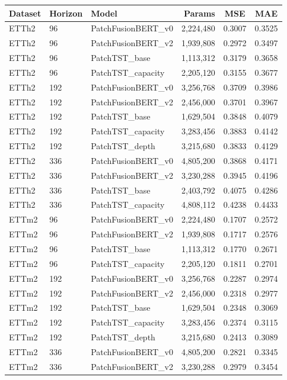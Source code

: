 \begin{tabular}{lllrcc}
\toprule
Dataset & Horizon & Model & Params & MSE & MAE \\
\midrule
ETTh2 & 96 & PatchFusionBERT_v0 & 2,224,480 & 0.3007 & 0.3525 \\
ETTh2 & 96 & PatchFusionBERT_v2 & 1,939,808 & 0.2972 & 0.3497 \\
ETTh2 & 96 & PatchTST_base & 1,113,312 & 0.3179 & 0.3658 \\
ETTh2 & 96 & PatchTST_capacity & 2,205,120 & 0.3155 & 0.3677 \\
ETTh2 & 192 & PatchFusionBERT_v0 & 3,256,768 & 0.3709 & 0.3986 \\
ETTh2 & 192 & PatchFusionBERT_v2 & 2,456,000 & 0.3701 & 0.3967 \\
ETTh2 & 192 & PatchTST_base & 1,629,504 & 0.3848 & 0.4079 \\
ETTh2 & 192 & PatchTST_capacity & 3,283,456 & 0.3883 & 0.4142 \\
ETTh2 & 192 & PatchTST_depth & 3,215,680 & 0.3833 & 0.4129 \\
ETTh2 & 336 & PatchFusionBERT_v0 & 4,805,200 & 0.3868 & 0.4171 \\
ETTh2 & 336 & PatchFusionBERT_v2 & 3,230,288 & 0.3945 & 0.4196 \\
ETTh2 & 336 & PatchTST_base & 2,403,792 & 0.4075 & 0.4286 \\
ETTh2 & 336 & PatchTST_capacity & 4,808,112 & 0.4238 & 0.4433 \\
ETTm2 & 96 & PatchFusionBERT_v0 & 2,224,480 & 0.1707 & 0.2572 \\
ETTm2 & 96 & PatchFusionBERT_v2 & 1,939,808 & 0.1717 & 0.2576 \\
ETTm2 & 96 & PatchTST_base & 1,113,312 & 0.1770 & 0.2671 \\
ETTm2 & 96 & PatchTST_capacity & 2,205,120 & 0.1811 & 0.2701 \\
ETTm2 & 192 & PatchFusionBERT_v0 & 3,256,768 & 0.2287 & 0.2974 \\
ETTm2 & 192 & PatchFusionBERT_v2 & 2,456,000 & 0.2318 & 0.2977 \\
ETTm2 & 192 & PatchTST_base & 1,629,504 & 0.2348 & 0.3069 \\
ETTm2 & 192 & PatchTST_capacity & 3,283,456 & 0.2374 & 0.3115 \\
ETTm2 & 192 & PatchTST_depth & 3,215,680 & 0.2413 & 0.3089 \\
ETTm2 & 336 & PatchFusionBERT_v0 & 4,805,200 & 0.2821 & 0.3345 \\
ETTm2 & 336 & PatchFusionBERT_v2 & 3,230,288 & 0.2979 & 0.3454 \\

\end{tabular}
